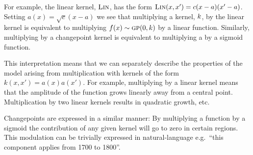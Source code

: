 \documentclass{article} %
\def\eg{e.g.\ }
\begin{document}
For example, the linear kernel, ${\textsc{Lin}}$, has the form ${\textsc{Lin}}(x, x') = c(x-a)(x'-a)$.
Setting $a(x) = \sqrt{c}(x-a)$ we see that multiplying a kernel, $k$, by the linear kernel is equivalent to multiplying $f(x) \sim {\textsc{gp}}{}(0, k)$ by a linear function.
Similarly, multiplying by a changepoint kernel is equivalent to multiplying a \gp{} by a sigmoid function.

This interpretation means that we can separately describe the properties of the model arising from multiplication with kernels of the form $k(x,x') = a(x)a(x')$.
%
For example, multiplying by a linear kernel means that the amplitude of the function grows linearly away from a central point.
Multiplication by two linear kernels results in quadratic growth, etc.

Changepoints are expressed in a similar manner: By multiplying a function by a sigmoid the contribution of any given kernel will go to zero in certain regions.  This modulation can be trivially expressed in natural-language \eg ``this component applies from 1700 to 1800''.






\end{document}
